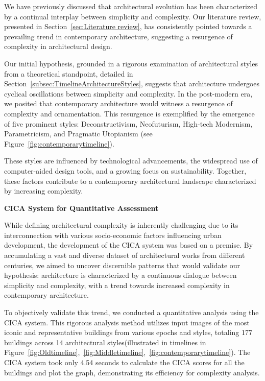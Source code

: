 %    

We have previously discussed that architectural evolution has been characterized by a continual interplay between simplicity and complexity.
Our literature review, presented in Section~\ref{sec:Literature review}, has consistently pointed towards a prevailing trend in contemporary architecture, suggesting a resurgence of complexity in architectural design.

Our initial hypothesis, grounded in a rigorous examination of architectural styles from a theoretical standpoint, detailed in Section~\ref{subsec:TimelineArchitectureStyles}, suggests that architecture undergoes cyclical oscillations between simplicity and complexity.
In the post-modern era, we posited that contemporary architecture would witness a resurgence of complexity and ornamentation.
This resurgence is exemplified by the emergence of five prominent styles: Deconstructivism, Neofuturism, High-tech Modernism, Parametricism, and Pragmatic Utopianism (see Figure~\ref{fig:contemporarytimeline}).

These styles are influenced by technological advancements, the widespread use of computer-aided design tools, and a growing focus on sustainability.
Together, these factors contribute to a contemporary architectural landscape characterized by increasing complexity.

\textbf{CICA System for Quantitative Assessment}

While defining architectural complexity is inherently challenging due to its interconnection with various socio-economic factors influencing urban development, the development of the CICA system was based on a premise.
By accumulating a vast and diverse dataset of architectural works from different centuries, we aimed to uncover discernible patterns that would validate our hypothesis: architecture is characterized by a continuous dialogue between simplicity and complexity, with a trend towards increased complexity in contemporary architecture.

To objectively validate this trend, we conducted a quantitative analysis using the CICA system.
This rigorous analysis method utilizes input images of the most iconic and representative buildings from various epochs and styles, totaling 177 buildings across 14 architectural styles(illustrated in timelines in Figure~\ref{fig:Oldtimeline},~\ref{fig:Middletimeline},~\ref{fig:contemporarytimeline}).
The CICA system took only 4.54 seconds to calculate the CICA scores for all the buildings and plot the graph, demonstrating its efficiency for complexity analysis.

